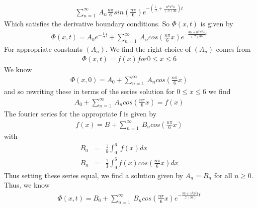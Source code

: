 \documentclass[11pt]{SelfArxOneColBMN}
\begin{document}
\begin{exercise}
\begin{solution}
\begin{eqnarray*}
     \sum_{n=1}^\infty\: A_n\frac{n\pi}{6}sin(\frac{n\pi}{6})e^{-(\frac{1}{.7} + \frac{n^2 \pi^2 4}{(.7)36})t} 
   \end{eqnarray*}
   Which satisfies the derivative boundary conditions. So $\Phi(x,t)$ is given by
   \begin{eqnarray*}
    \Phi(x,t) = A_0e^{-\frac{1}{.7}t} + \sum_{n=1}^\infty\: A_ncos(\frac{n\pi}{6}x)e^{-\frac{36 + n^2\pi^2 4}{(.7)36}t}
   \end{eqnarray*}
   For appropriate constants $(A_n)$. We find the right choice of $(A_n)$ comes from
   \begin{eqnarray*}
    \Phi(x,t) = f(x) for 0 \leq x \leq 6
   \end{eqnarray*}
   We know
   \begin{eqnarray*}
    \Phi(x,0) = A_0 + \sum_{n=1}^\infty\: A_ncos(\frac{n\pi}{6}x)
   \end{eqnarray*}
   and so rewriting these in terms of the series solution for $0 \leq x \leq 6$ we find
   \begin{eqnarray*}
    A_0 + \sum_{n=1}^\infty\: A_ncos(\frac{n\pi}{6}x) = f(x)
   \end{eqnarray*}
   The fourier series for the appropriate f is given by
   \begin{eqnarray*}
    f(x) = B + \sum_{n=1}^\infty\: B_ncos(\frac{n\pi}{6}x)
   \end{eqnarray*}
   with
   \begin{eqnarray*}
    B_0 &=& \frac{1}{6}\int_0^6 \: f(x)dx\\
    B_n &=& \frac{1}{3}\int_0^6f(x)cos(\frac{n\pi}{6}x)dx
   \end{eqnarray*}
   Thus setting these series equal, we find a solution given by $A_n = B_n$ for all $n \geq 0$. Thus, we know
   \begin{eqnarray*}
    \Phi(x,t) = B_0 + \sum_{n = 1}^\infty \: B_ncos(\frac{n\pi}{6}x)e^{-\frac{36 + n^2\pi^2 4}{.7(36)}t}
   \end{eqnarray*}
  \end{solution}
\end{exercise}
\end{document}
